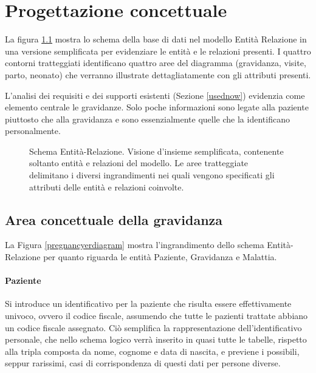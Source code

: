 \chapter{Progettazione concettuale}
\label{conceptual}

\newcommand{\ent}[1]{{\Large #1}}
\newcommand{\card}[1]{{\footnotesize #1}}
\newcommand{\CZU}{\card{(0,1)}}
\newcommand{\CZN}{\card{(0,n)}}
\newcommand{\CUU}{\card{(1,1)}}
\newcommand{\CUN}{\card{(1,n)}}

La figura \ref{completeerdiagram} mostra lo schema della base di dati nel modello Entità Relazione in una versione semplificata per evidenziare le entità e le relazioni presenti.
I quattro contorni tratteggiati identificano quattro aree del diagramma (gravidanza, visite, parto, neonato) che verranno illustrate dettagliatamente con gli attributi presenti.

L'analisi dei requisiti e dei supporti esistenti (Sezione \ref{usednow}) evidenzia come elemento centrale le gravidanze.
Solo poche informazioni sono legate alla paziente piuttosto che alla gravidanza e sono essenzialmente quelle che la identificano personalmente.

\begin{figure}
    \centering
    
    \caption{Schema Entità-Relazione. Visione d'insieme semplificata, contenente soltanto entità e relazioni del modello. Le aree tratteggiate delimitano i diversi ingrandimenti nei quali vengono specificati gli attributi delle entità e relazioni coinvolte.}
    \label{completeerdiagram}
\end{figure}

\section{Area concettuale della gravidanza}

La Figura \ref{pregnancyerdiagram} mostra l'ingrandimento dello schema Entità-Relazione per quanto riguarda le entità Paziente, Gravidanza e Malattia.

\subsubsection{Paziente}

Si introduce un identificativo per la paziente che risulta essere effettivamente univoco, ovvero il codice fiscale, assumendo che tutte le pazienti trattate abbiano un codice fiscale assegnato.
Ciò semplifica la rappresentazione dell'identificativo personale, che nello schema logico verrà inserito in quasi tutte le tabelle, rispetto alla tripla composta da nome, cognome e data di nascita, e previene i possibili, seppur rarissimi, casi di corrispondenza di questi dati per persone diverse.

